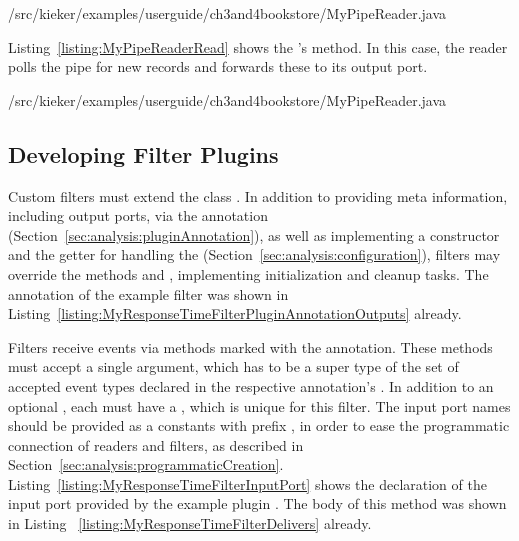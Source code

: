  \pagebreak

\setJavaCodeListing
%
{\customComponentsBookstoreApplicationDir/src/kieker/examples/userguide/ch3and4bookstore/MyPipeReader.java}


\noindent Listing~\ref{listing:MyPipeReaderRead} shows the 's %
 method. In this case, the reader polls the pipe for new records %
and forwards these to its output port.

\setJavaCodeListing
%
{\customComponentsBookstoreApplicationDir/src/kieker/examples/userguide/ch3and4bookstore/MyPipeReader.java}

\vspace{-0.2cm}

\subsection{Developing Filter Plugins}\label{sec:analysis:filters}

Custom filters must extend the class . %
In addition to providing meta information, including output ports, via the %
 annotation %
(Section~\ref{sec:analysis:pluginAnnotation}), as well as implementing a constructor %
and the getter for handling the  (Section~\ref{sec:analysis:configuration}), %
filters may override the methods  and %
, implementing initialization and cleanup tasks. %
The  annotation of the example filter  %
was shown in Listing~\ref{listing:MyResponseTimeFilterPluginAnnotationOutputs} already.

\enlargethispage{1cm}

Filters receive events via methods marked with the  %
annotation. These methods must accept a single argument, which has to be %
a super type of the set of accepted event types declared in the respective %
 annotation's . %
In addition to an optional , each  %
must have a , which is unique for this filter. The input port names %
should be provided as a  constants %
with prefix , in order to ease the programmatic %
connection of readers and filters, as described in %
Section~\ref{sec:analysis:programmaticCreation}. %
Listing~\ref{listing:MyResponseTimeFilterInputPort} shows the declaration %
of the input port provided by the example plugin . %
The body of this method was shown in Listing~%
\ref{listing:MyResponseTimeFilterDelivers} already.

